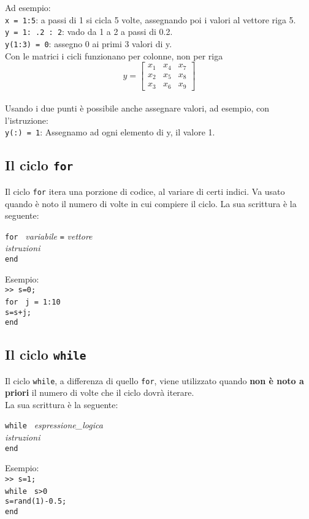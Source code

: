 Ad esempio: \\
\texttt{x = 1:5}: a passi di 1 si cicla 5 volte, assegnando poi i valori al vettore riga 5. \\
\texttt{y = 1: .2 : 2}: vado da 1 a 2 a passi di 0.2. \\
\texttt{y(1:3) = 0}: assegno 0 ai primi 3 valori di y. \\

Con le matrici i cicli funzionano per colonne, non per riga\\

$$ y = 
\begin{bmatrix}
    x_{1}       & x_{4} & x_{7} \\
    x_{2}       & x_{5} & x_{8} \\
    x_{3}       & x_{6} & x_{9}
\end{bmatrix}$$
\\
Usando i due punti è possibile anche assegnare valori, ad esempio, con l'istruzione:\\
\texttt{y(:) = 1}: Assegnamo ad ogni elemento di y, il valore 1.

\subsection{Il ciclo \texttt{for}}
Il ciclo \texttt{for} itera una porzione di codice, al variare di certi indici. Va usato quando è noto il numero di 
volte in cui compiere il ciclo. La sua scrittura è la seguente:
\begin{center}
\texttt{for } \textit{variabile} \texttt{=} \textit{vettore} \\ 
\hspace{1.5cm}\textit{istruzioni}  \\
\hspace{-3.5cm}\texttt{end}
\end{center}

Esempio: \\
\texttt{>> s=0;} \\
\texttt{for } \texttt{j = 1:10} \\ 
\hspace{1cm}\texttt{s=s+j;}  \\
\texttt{end}

\subsection{Il ciclo \texttt{while}}
Il ciclo \texttt{while}, a differenza di quello \texttt{for}, viene utilizzato quando \textbf{non è noto a priori} il 
numero di volte che il ciclo dovrà iterare. \\
La sua scrittura è la seguente:
\begin{center}
\texttt{while } \textit{espressione\_logica} \\ 
\hspace{1.5cm}\textit{istruzioni}  \\
\hspace{-4.1cm}\texttt{end}
\end{center}

Esempio: \\
\texttt{>> s=1;} \\
\texttt{while } \texttt{s>0} \\ 
\hspace{1cm}\texttt{s=rand(1)-0.5;}  \\
\texttt{end}